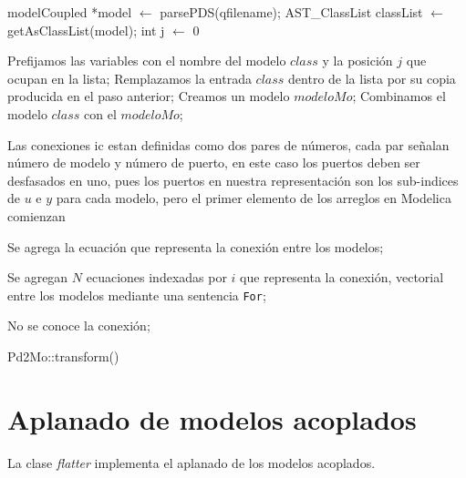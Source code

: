 \begin{algorithm}
\begin{algorithmic}[1]
\State modelCoupled *model $\gets$ parsePDS(qfilename);
\State AST\_ClassList classList $\gets$ getAsClassList(model); 
\State int j $\gets$ 0\;

 		Prefijamos las variables con el nombre del modelo $class$ y la posición $j$ que ocupan en la lista;
 		Remplazamos la entrada $class$ dentro de la lista por su copia producida en el paso anterior;
 	\EndIf
\EndFor
\State Creamos un modelo $modeloMo$;
 	Combinamos el modelo $class$ con el $modeloMo$;
\EndFor


Las conexiones ic estan definidas como dos pares de números, cada par señalan número  de modelo y número de puerto, en este caso los puertos deben ser desfasados en uno, pues los puertos en nuestra representación son los sub-indices de $u$ e $y$ para cada modelo, pero el primer elemento de los arreglos en Modelica comienzan

  		Se agrega la ecuación que representa la conexión entre los modelos;


  		Se agregan $N$ ecuaciones indexadas por $i$ que representa la conexión, vectorial entre los modelos mediante una sentencia \texttt{For};

  	\Else

  		No se conoce la conexión;

	\EndIf
\EndFor
\end{algorithmic}
 \caption{Pd2Mo::transform()}
\end{algorithm}

\section{Aplanado de modelos acoplados}
La clase \emph{flatter} implementa el aplanado de los modelos acoplados.
 
